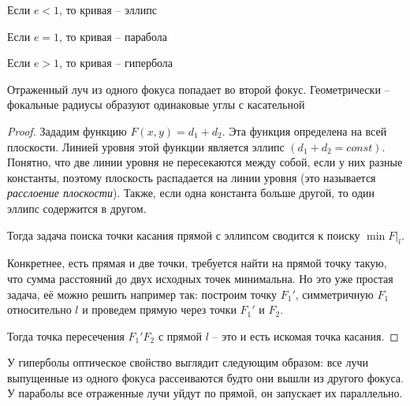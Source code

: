 \begin{Rem}
	\begin{MyItemize}
		\item Если $e < 1$, то кривая -- эллипс
		\item Если $e = 1$, то кривая -- парабола
		\item Если $e > 1$, то кривая -- гипербола
	\end{MyItemize}

	\begin{figure}[H]
		\centering
		\def\svgwidth{.35\columnwidth}
		
	\end{figure}
\end{Rem}

\begin{Property}
	Отраженный луч из одного фокуса попадает во второй фокус. Геометрически -- фокальные радиусы образуют одинаковые углы с касательной
\end{Property}

\begin{proof}
    Зададим функцию $F(x, y) = d_1 + d_2$. Эта функция определена на всей плоскости. Линией уровня этой функции является эллипс $(d_1 + d_2 = const)$.
    Понятно, что две линии уровня не пересекаются между собой, если у них разные константы, поэтому плоскость распадается на линии уровня (это называется \textit{расслоение плоскости}).
    Также, если одна константа больше другой, то один эллипс содержится в другом. 

	\begin{figure}[H]
		\centering
		\def\svgwidth{.35\columnwidth}
			
	\end{figure}

    Тогда задача поиска точки касания прямой с эллипсом сводится к поиску $\min F|_l$. 

    Конкретнее, есть прямая и две точки, требуется найти на прямой точку такую, что сумма расстояний до двух исходных точек минимальна.
	Но это уже простая задача, её можно решить например так: построим точку $F_1'$, симметричную $F_1$ относительно $l$ и проведем прямую через точки $F_1'$ и $F_2$. 

	\begin{figure}[H]
		\centering
		\def\svgwidth{.35\columnwidth}
			
	\end{figure}

	Тогда точка пересечения $F_1' F_2$ с прямой $l$ -- это и есть искомая точка касания. 
\end{proof}

\begin{Rem}
	У гиперболы оптическое свойство выглядит следующим образом: все лучи выпущенные из одного фокуса рассеиваются будто они вышли из другого фокуса. 
	У параболы все отраженные лучи уйдут по прямой, он запускает их параллельно. 
\end{Rem}

\begin{figure}[h]
	\centering
	\def\svgwidth{.7\columnwidth}
		
\end{figure}

